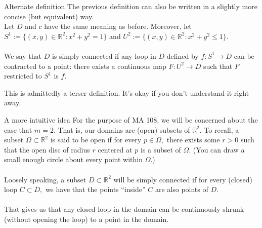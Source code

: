 \documentclass[handout, aspectratio=169]{beamer}
\begin{document}
\begin{frame}{Alternate definition}
	The previous definition can also be written in a slightly more concise (but equivalent) way.\\
	Let $D$ and $c$ have the same meaning as before. Moreover, let $S^1 := \{(x, y) \in \mathbb{R}^2 : x^2 + y^2 = 1\}$ and $U^2 := \{(x, y) \in \mathbb{R}^2 : x^2 + y^2 \le 1\}.$\\~\\
	We say that $D$ is simply-connected if any loop in $D$ defined by $f:S^1 \to D$ can be contracted to a point: there exists a continuous map $F:U^2 \to D$ such that $F$ restricted to $S^1$ is $f.$

	\hrulefill

	This is admittedly a terser definition. It's okay if you don't understand it right away.
\end{frame}
\begin{frame}{A more intuitive idea} 
	For the purpose of MA 108, we will be concerned about the case that $m = 2.$ That is, our domains are (open) subsets of $\mathbb{R}^2.$ To recall, a subset $\Omega \subset \mathbb{R}^2$ is said to be open if for every $p \in \Omega,$ there exists some $r > 0$ such that the open disc of radius $r$ centered at $p$ is a subset of $\Omega.$ (You can draw a small enough circle about every point within $\Omega.$)\\~\\
	Loosely speaking, a subset $D \subset \mathbb{R}^2$ will be simply connected if for every (closed) loop $C \subset D,$ we have that the points ``inside'' $C$ are also points of $D.$\\~\\
	That gives us that any closed loop in the domain can be continuously shrunk (without opening the loop) to a point in the domain.
\end{frame}
\end{document}
